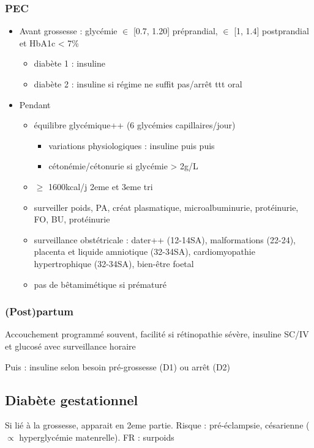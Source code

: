 \documentclass{book}
\begin{document}
\subsubsection{PEC}
\label{sec:org31eb98c}
\begin{itemize}
\item Avant grossesse : glycémie \(\in\) [0.7, 1.20] préprandial, \(\in\) [1, 1.4]
postprandial et HbA1c < 7\%
\begin{itemize}
\item diabète 1 : \inc insuline
\item diabète 2 : insuline si régime ne suffit pas/arrêt ttt oral
\end{itemize}
\item Pendant    
\begin{itemize}
\item équilibre glycémique++ (6 glycémies capillaires/jour)
\begin{itemize}
\item \danger variations physiologiques : insuline \dec puis \inc puis \dec\dec
\item cétonémie/cétonurie si glycémie > 2g/L
\end{itemize}
\item \(\ge\) 1600kcal/j 2eme et 3eme tri
\item surveiller poids, PA, créat plasmatique, microalbuminurie, protéinurie, FO,
BU, protéinurie
\item surveillance obstétricale : dater++ (12-14SA), malformations (22-24), placenta et liquide
amniotique (32-34SA), cardiomyopathie hypertrophique (32-34SA), bien-être
foetal
\item pas de bêtamimétique si prématuré
\end{itemize}
\end{itemize}
\subsubsection{(Post)partum}
\label{sec:orgc6f5e1c}
Accouchement programmé souvent, facilité si rétinopathie sévère, insuline
  SC/IV et glucosé avec surveillance horaire

Puis : insuline selon besoin pré-grossesse (D1) ou arrêt (D2)

\subsection{Diabète gestationnel}
\label{sec:org3efa28c}
Si lié à la grossesse, apparait en 2eme partie. Risque : pré-éclampsie,
césarienne (\(\propto\) hyperglycémie matenrelle). FR : surpoids 
\end{document}
